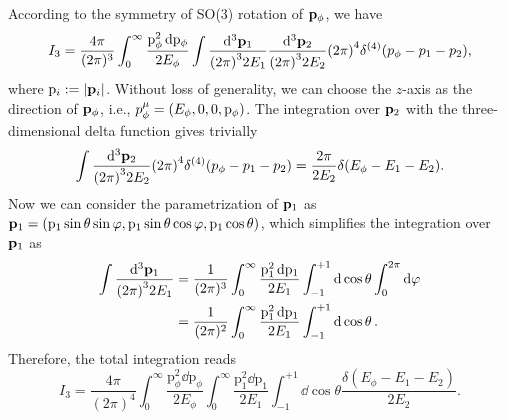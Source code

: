 \documentclass{article}
\begin{document}
            According to the symmetry of SO(3) rotation of $\vb{p}_\phi$, we have
            \begin{equation}
                I_3 = \frac{4 \pi}{(2 \pi)^3} \int_0^\infty \frac{\mathrm{p}_\phi^2 \dd{\mathrm{p}_\phi}}{2 E_\phi} \int \frac{\dd[3]{\vb{p}_1}}{\qty(2 \pi)^3 2 E_1} \frac{\dd[3]{\vb{p}_2}}{\qty(2 \pi)^3 2 E_2} \qty(2 \pi)^4 \delta^{(4)}\qty(p_\phi - p_1 - p_2),
            \end{equation}
            where $\mathrm{p}_i := \abs{\vb{p}_i}$.
            Without loss of generality, we can choose the $z$-axis as the direction of $\vb{p}_\phi$, i.e., $p_\phi^\mu = \qty(E_\phi, 0, 0, \mathrm{p}_\phi)$.
            The integration over $\vb{p}_2$ with the three-dimensional delta function gives trivially
            \begin{equation}
                \int \frac{\dd[3]{\vb{p}_2}}{\qty(2 \pi)^3 2 E_2} \qty(2 \pi)^4 \delta^{(4)}\qty(p_\phi - p_1 - p_2) = \frac{2 \pi}{2 E_2} \delta(E_\phi - E_1 - E_2).
            \end{equation}
            Now we can consider the parametrization of $\vb{p}_1$ as $\vb{p}_1 = \qty(\mathrm{p}_1 \sin \theta \sin \varphi, \mathrm{p}_1 \sin \theta \cos \varphi, \mathrm{p}_1 \cos\theta)$, which simplifies the integration over $\vb{p}_1$ as
            \begin{equation}
                \begin{aligned}
                    \int \frac{\dd[3]{\vb{p}_1}}{\qty(2 \pi)^3 2 E_1} & = \frac{1}{(2 \pi)^3} \int_0^\infty \frac{\mathrm{p}_1^2 \dd{\mathrm{p}_1}}{2 E_1} \int_{-1}^{+1} \dd{\cos \theta} \int_0^{2 \pi} \dd{\varphi} \\
                    & = \frac{1}{(2 \pi)^2} \int_0^\infty \frac{\mathrm{p}_1^2 \dd{\mathrm{p}_1}}{2 E_1} \int_{-1}^{+1} \dd{\cos \theta}.
                \end{aligned}
            \end{equation}
            Therefore, the total integration reads
            \begin{equation}
                I_3 = \frac{4 \pi}{(2 \pi)^4} \int_0^\infty \frac{\mathrm{p}_\phi^2 \dd{\mathrm{p}_\phi}}{2 E_\phi} \int_0^\infty \frac{\mathrm{p}_1^2 \dd{\mathrm{p}_1}}{2 E_1} \int_{-1}^{+1} \dd{\cos \theta} \frac{\delta(E_\phi - E_1 - E_2)}{2 E_2}.
            \end{equation}
\end{document}

